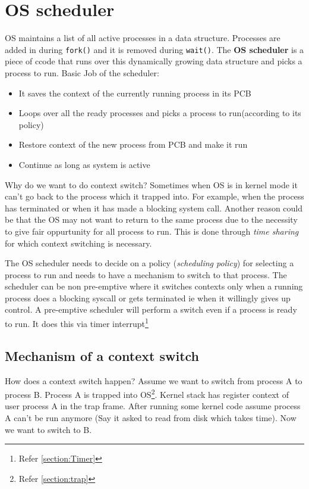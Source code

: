 \documentclass[12pt]{article}
\newcommand{\tbox}[1]{\noindent\fbox{\parbox{\textwidth}{#1}}}
\begin{document}
\noindent\tbox{
    \begin{center}
    \textbf{\Huge Lecture 8}
    \end{center}
}
\section{OS scheduler}

OS maintains a list of all active processes in a data structure. Processes are added in during \texttt{fork()} and it is removed during \texttt{wait()}.
The \textbf{OS scheduler} is a piece of ccode that runs over this dynamically growing data structure and picks a process to run.
Basic Job of the scheduler:
\begin{itemize}[topsep=0pt, partopsep=0pt, itemsep=0pt, parsep=0pt]
    \item It saves the context of the currently running process in its PCB
    \item Loops over all the ready processes and picks a process to run(according to its policy)
    \item Restore context of the new process from PCB and make it run
    \item Continue as long as system is active
\end{itemize}

Why do we want to do context switch?
Sometimes when OS is in kernel mode it can't go back to the process which it trapped into. For example, when the process has terminated or when it has made a blocking system call.
Another reason could be that the OS may not want to return to the same process due to the necessity to give fair oppurtunity for all process to run. This is done through \textit{time sharing} for which context switching is necessary.

The OS scheduler needs to decide on a policy (\textit{scheduling policy}) for selecting a process to run and needs to have a mechanism to switch to that process. The scheduler can be non pre-emptive where it switches contexts only
 when a running process does a blocking syscall or gets terminated ie when it willingly gives up control. A pre-emptive scheduler will perform a switch even if a process is ready to run. It does this via timer interrupt\footnote{Refer \ref{section:Timer}}



\subsection{Mechanism of a context switch}
 How does a context switch happen? Assume we want to switch from process A to process B. Process A is trapped into OS\footnote{Refer \ref{section:trap}}. Kernel stack has register context of user process A in the trap frame.
 After running some kernel code assume process A can't be run anymore (Say it asked to read from disk which takes time). Now we want to switch to B. 
\end{document}

